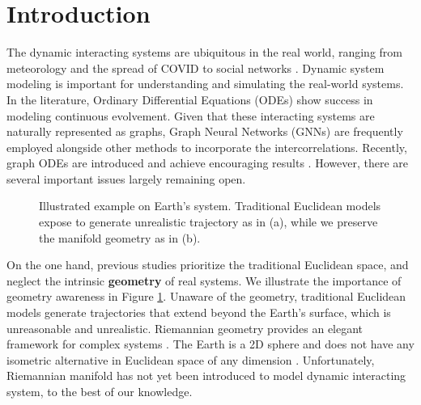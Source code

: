 


\section{Introduction}
The dynamic interacting systems are ubiquitous in the real world, 
ranging from meteorology
and the spread of COVID \cite{www24CausalGraphODE}
to social networks \cite{icml23HOPE}.
Dynamic system modeling is important for understanding and simulating the real-world systems.
In the literature, 
Ordinary Differential Equations (ODEs) \cite{nips18NODE} show success in modeling continuous evolvement.
Given that these interacting systems are naturally represented as graphs, Graph Neural Networks (GNNs) \cite{nips18gat} are frequently employed alongside other methods to incorporate the intercorrelations.
Recently, graph ODEs are introduced and achieve encouraging results \cite{kdd21CoupledGraphODE}.
However, there are several important issues largely remaining open.

\begin{figure} 
\centering 
{}
 \vspace{-0.05in}
\caption{Illustrated example on Earth's system. Traditional Euclidean models expose to generate unrealistic trajectory as in (a), while we preserve the manifold geometry as in (b).}
\label{Fig-example}
\end{figure}



On the one hand, previous studies prioritize the traditional Euclidean space, and neglect the intrinsic \textbf{geometry} of real systems.
We illustrate the importance of geometry awareness in Figure \ref{Fig-example}. 
Unaware of the geometry,  traditional Euclidean models generate trajectories that extend beyond the Earth's surface, which is unreasonable and unrealistic.
Riemannian geometry provides an elegant framework for complex systems \cite{aaai22sunli}. The Earth is a 2D sphere and does not have any isometric alternative in Euclidean space of any dimension \cite{o2009}.
Unfortunately, Riemannian manifold has not yet been introduced to model dynamic interacting system, to the best of our knowledge.

